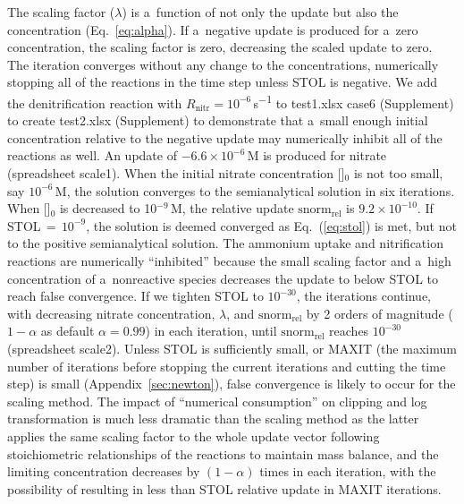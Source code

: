 \documentclass[gmd,noline]{copernicus}
\begin{document}
      The scaling factor ($\lambda$) is a~function of not only the update
      but also the concentration (Eq.~\ref{eq:alpha}). If
      a~negative update is produced for a~zero concentration, the scaling
      factor is zero, decreasing the scaled update to zero. The iteration
      converges without any change to the concentrations, numerically
      stopping all of the reactions in the time step unless STOL is
      negative. We add the denitrification reaction with $R_{\text{nitr}} =
      10^{-6}$\,\unit{s^{-1}} to  test1.xlsx case6 (Supplement) to create  test2.xlsx
      (Supplement)
      to demonstrate that a~small enough initial concentration relative to
      the negative update may numerically inhibit all of the reactions as
      well.  An update of $-6.6 \times 10^{-6}$\,\unit{M} is produced for
      nitrate (spreadsheet scale1). When the initial nitrate concentration
      []$_0$ is not too small, say $10^{-6}$\,\unit{M}, the
      solution converges to the semianalytical solution in six
      iterations. When []$_0$ is decreased to
      10$^{-9}$\,\unit{M}, the relative update $\text{snorm}_{\text{rel}}$
      is $9.2\times 10^{-10}$. If STOL\,$=$\,$10^{-9}$, the solution is
      deemed converged as Eq.~(\ref{eq:stol}) is met, but not to the
      positive semianalytical solution. The ammonium uptake and
      nitrification reactions are numerically ``inhibited'' because the
      small scaling factor and a~high concentration of a~nonreactive species
      decreases the update to below STOL to reach false convergence. If we
      tighten STOL to $10^{-30}$, the iterations continue, with decreasing
      nitrate concentration, $\lambda$, and $\text{snorm}_{\text{rel}}$ by
      2 orders of magnitude ($1-\alpha$ as default $\alpha=0.99$) in each
      iteration, until $\text{snorm}_{\text{rel}}$ reaches $10^{-30}$
      (spreadsheet scale2). Unless STOL is sufficiently small, or MAXIT (the
      maximum number of iterations before stopping the current iterations
      and cutting the time step) is small (Appendix~\ref{sec:newton}), false
      convergence is likely to occur for the scaling method. The impact of
      ``numerical consumption'' on clipping and log transformation is much
      less dramatic than the scaling method as the latter applies the same
      scaling factor to the whole update vector following stoichiometric
      relationships of the reactions to maintain mass balance, and the
      limiting concentration decreases by $(1-\alpha)$ times in each
      iteration, with the possibility of resulting in less than STOL
      relative update in MAXIT iterations.
\end{document}
